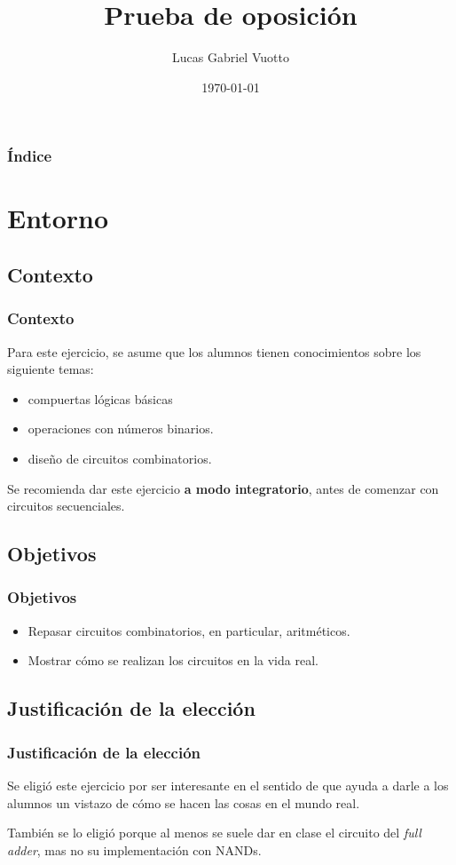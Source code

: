 \documentclass[mathserif,hyperref]{beamer}
\title{Prueba de oposición}
\author{Lucas Gabriel Vuotto}
\date{\today}
\begin{document}
\begin{frame}
\titlepage %
\end{frame}


\begin{frame}
\frametitle{Índice}
\tableofcontents
\end{frame}


\section{Entorno}

\subsection{Contexto}
\begin{frame}
\frametitle{Contexto}
Para este ejercicio, se asume que los alumnos tienen conocimientos sobre los
siguiente temas:
\begin{itemize}
  \item compuertas lógicas básicas
  \item operaciones con números binarios.
  \item diseño de circuitos combinatorios.
\end{itemize}

\vspace{0.5cm}
Se recomienda dar este ejercicio \textbf{a modo integratorio}, antes de
comenzar con circuitos secuenciales.
\end{frame}


\subsection{Objetivos}
\begin{frame}
\frametitle{Objetivos}
\begin{itemize}
  \item Repasar circuitos combinatorios, en particular, aritméticos.
  \item Mostrar cómo se realizan los circuitos en la vida real.
\end{itemize}
\end{frame}


\subsection{Justificación de la elección}
\begin{frame}
\frametitle{Justificación de la elección}
Se eligió este ejercicio por ser interesante en el sentido de que ayuda a
darle a los alumnos un vistazo de cómo se hacen las cosas en el mundo real.

\vspace{0.5cm}
También se lo eligió porque al menos se suele dar en clase el circuito del
\textit{full adder}, mas no su implementación con NANDs.
\end{frame}
\end{document}
